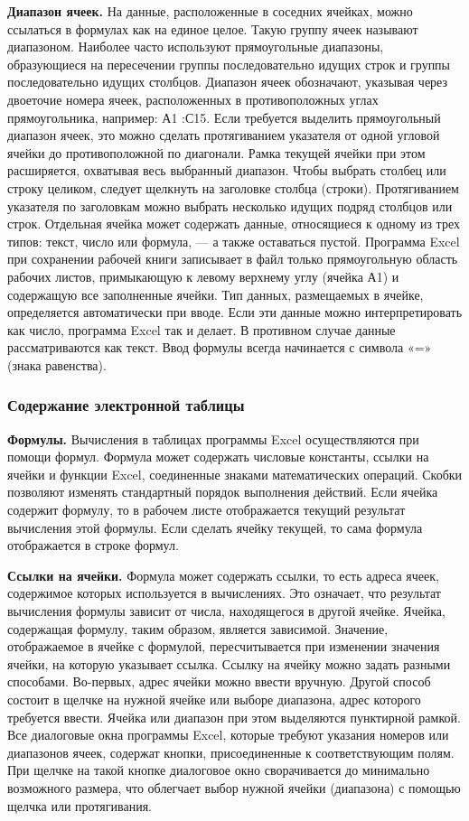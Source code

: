 \documentclass[a4paper]{article}
\begin{document}
\textbf{Диапазон ячеек.} На данные, расположенные в соседних ячейках, можно ссылаться в формулах как на единое целое. Такую группу ячеек называют диапазоном. Наиболее часто используют прямоугольные диапазоны, образующиеся на пересечении группы последовательно идущих строк и группы последовательно идущих столбцов. Диапазон ячеек обозначают, указывая через двоеточие номера ячеек, расположенных в противоположных углах прямоугольника, например: А1 :С15. Если требуется выделить прямоугольный диапазон ячеек, это можно сделать протягиванием указателя от одной угловой ячейки до противоположной по диагонали. Рамка текущей ячейки при этом расширяется, охватывая весь выбранный диапазон. Чтобы выбрать столбец или строку целиком, следует щелкнуть на заголовке столбца (строки). Протягиванием указателя по заголовкам можно выбрать несколько идущих подряд столбцов или строк. Отдельная ячейка может содержать данные, относящиеся к одному из трех типов: текст, число или формула, --- а также оставаться пустой. Программа Excel при сохранении рабочей книги записывает в файл только прямоугольную область рабочих листов, примыкающую к левому верхнему углу (ячейка А1) и содержащую все заполненные ячейки. Тип данных, размещаемых в ячейке, определяется автоматически при вводе. Если эти данные можно интерпретировать как число, программа Excel так и делает. В противном случае данные рассматриваются как текст. Ввод формулы всегда начинается с символа «=» (знака равенства).

\subsubsection{Содержание электронной таблицы}

\textbf{Формулы.} Вычисления в таблицах программы Excel осуществляются при помощи формул. Формула может содержать числовые константы, ссылки на ячейки и функции Excel, соединенные знаками математических операций. Скобки позволяют изменять стандартный порядок выполнения действий. Если ячейка содержит формулу, то в рабочем листе отображается текущий результат вычисления этой формулы. Если сделать ячейку текущей, то сама формула отображается в строке формул.

\textbf{Ссылки на ячейки.} Формула может содержать ссылки, то есть адреса ячеек, содержимое которых используется в вычислениях. Это означает, что результат вычисления формулы зависит от числа, находящегося в другой ячейке. Ячейка, содержащая формулу, таким образом, является зависимой. Значение, отображаемое в ячейке с формулой, пересчитывается при изменении значения ячейки, на которую указывает ссылка. Ссылку на ячейку можно задать разными способами. Во-первых, адрес ячейки можно ввести вручную. Другой способ состоит в щелчке на нужной ячейке или выборе диапазона, адрес которого требуется ввести. Ячейка или диапазон при этом выделяются пунктирной рамкой. Все диалоговые окна программы Excel, которые требуют указания номеров или диапазонов ячеек, содержат кнопки, присоединенные к соответствующим полям. При щелчке на такой кнопке диалоговое окно сворачивается до минимально возможного размера, что облегчает выбор нужной ячейки (диапазона) с помощью щелчка или протягивания.
\end{document}
